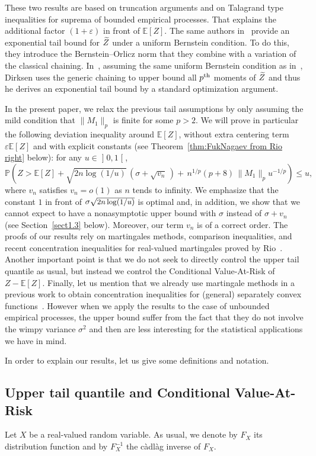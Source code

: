 \documentclass[10pt]{amsart}
\theoremstyle{definition}\newtheorem{defi}[theo]{Definition}\newtheorem{rema}[theo]{Remark}\newtheorem{exam}[theo]{Example}\newtheorem{exem}[theo]{Example}\newtheorem{nota}[theo]{Notation}
\newcommand{\bE}{\mathbb{E}}
\newcommand{\bP}{\mathbb{P}}
\newcommand{\intervalleoo}[2]{\mathopen{]} #1\mathclose{}\mathpunct{},#2\mathclose{[}}
\let\oldtilde\tilde
\renewcommand*{\tilde}[1]{\mathchoice{\widetilde{#1}}{\widetilde{#1}}{\oldtilde{#1}}{\oldtilde{#1}}}
\begin{document}
These two results are based on truncation arguments and on Talagrand type inequalities for suprema of bounded empirical processes. That explains the additional factor $(1+\varepsilon)$ in front of $\bE[Z]$. The same authors in~\cite[Theorem~8]{vdGL13} provide an exponential tail bound for $\tilde Z$ under a uniform Bernstein condition. To do this, they introduce the Bernstein--Orlicz norm that they combine with a variation of the classical chaining. In~\cite[Corollary~5.2]{Dirksen15}, assuming the same uniform Bernstein condition as in~\cite{vdGL13}, Dirksen uses the generic chaining to upper bound all $p^{\rm th}$ moments of $\tilde Z$ and thus he derives an exponential tail bound by a standard optimization argument.

In the present paper, we relax the previous tail assumptions by only assuming the mild condition that $\|M_1\|_p$ is finite for some $p>2$. We will prove in particular the following deviation inequality around $\bE[Z]$, without extra centering term $\varepsilon\bE[Z]$ and with explicit constants (see Theorem~\ref{thm:FukNagaev from Rio right} below): for any $u\in\intervalleoo 01$,
\[
\bP\left(Z>\bE[Z]+\sqrt{2n\log(1/u)}\,\left(\sigma+\sqrt{v_n}\,\right)+\,n^{1/p}(p+8)\,\|M_1\|_p u^{-1/p}\right)\leq u,
\]
where $v_n$ satisfies $v_n=o(1)$ as $n$ tends to infinity. We emphasize that the constant $1$ in front of $\sigma\sqrt{\text{\small{$2n\log(1/u)$}}}$ is optimal and, in addition, we show that we cannot expect to have a nonasymptotic upper bound with $\sigma$ instead of $\sigma+v_n$ (see Section~\ref{sect1.3} below). Moreover, our term $v_n$ is of a correct order. The proofs of our results rely on martingales methods, comparison inequalities, and recent concentration inequalities for real-valued martingales proved by Rio~\cite{Rio17a}. Another important point is that we do not seek to directly control the upper tail quantile as usual, but instead we control the Conditional Value-At-Risk of $Z-\bE[Z]$. Finally, let us mention that we already use martingale methods in a previous work to obtain concentration inequalities for (general) separately convex functions~\cite{Marchina18a}. However when we apply the results to the case of unbounded empirical processes, the upper bound suffer from the fact that they do not involve the wimpy variance $\sigma^2$ and then are less interesting for the statistical applications we have in mind.

In order to explain our results, let us give some definitions and notation.

\subsection{Upper tail quantile and Conditional Value-At-Risk}
Let $X$ be a real-valued random variable. As usual, we denote by $F_X$ its distribution function and by $F_X^{-1}$ the càdlàg inverse of $F_X$.
\end{document}
